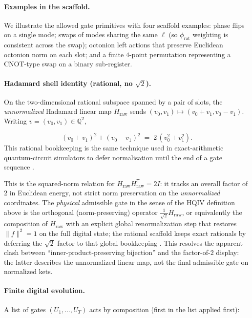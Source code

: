 \documentclass[11pt,a4paper]{article}
\theoremstyle{remark}
\begin{document}
\paragraph{Examples in the scaffold.}
We illustrate the allowed gate primitives with four scaffold examples: phase flips on a single mode; swaps of modes sharing the same $\ell$ (so $\phi_{\mathrm{rat}}$ weighting is consistent across the swap); octonion left actions that preserve Euclidean octonion norm on each slot; and a finite $4$-point permutation representing a CNOT-type swap on a binary sub-register.

\paragraph{Hadamard shell identity (rational, no $\sqrt{2}$).}
On the two-dimensional rational subspace spanned by a pair of slots, the \emph{unnormalized} Hadamard linear map $H_{\mathrm{raw}}$ sends $(v_0,v_1)\mapsto(v_0+v_1,v_0-v_1)$. Writing $v=(v_0,v_1)\in\mathbb{Q}^2$,

\begin{equation}
  (v_0+v_1)^2 + (v_0-v_1)^2 \;=\; 2\,(v_0^2+v_1^2).
\end{equation}
This rational bookkeeping is the same technique used in exact-arithmetic quantum-circuit simulators to defer normalisation until the end of a gate sequence \cite{smith2019exact}.

This is the squared-norm relation for $H_{\mathrm{raw}}H_{\mathrm{raw}}^{\mathsf T}=2I$: it tracks an overall factor of $2$ in Euclidean energy, not strict norm preservation on the \emph{unnormalized} coordinates. The \emph{physical} admissible gate in the sense of the HQIV definition above is the orthogonal (norm-preserving) operator $\tfrac{1}{\sqrt{2}}H_{\mathrm{raw}}$, or equivalently the composition of $H_{\mathrm{raw}}$ with an explicit global renormalization step that restores $\|f\|^2=1$ on the full digital state; the rational scaffold keeps exact rationals by deferring the $\sqrt{2}$ factor to that global bookkeeping \cite{hadamardMatrixMathWorld}. This resolves the apparent clash between ``inner-product-preserving bijection'' and the factor-of-$2$ display: the latter describes the unnormalized linear map, not the final admissible gate on normalized kets.

\paragraph{Finite digital evolution.}
A list of gates $(U_1,\ldots,U_T)$ acts by composition (first in the list applied first):
\end{document}
